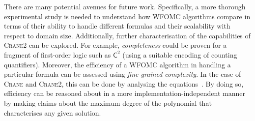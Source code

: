\documentclass[letterpaper]{article} %
\theoremstyle{remark}
\theoremstyle{definition}
\newcommand{\Ctwo}{$\mathsf{C}^{2}$}
\newcommand{\Cranetwo}{\textsc{Crane2}}
\begin{document}
There are many potential avenues for future work. Specifically, a more thorough
experimental study is needed to understand how WFOMC algorithms compare in terms
of their ability to handle different formulas and their scalability with respect
to domain size. Additionally, further characterisation of the capabilities of
\Cranetwo{} can be explored. For example, \emph{completeness} could be proven
for a fragment of first-order logic such as \Ctwo{} (using a suitable encoding
of counting quantifiers). Moreover, the efficiency of a WFOMC algorithm in
handling a particular formula can be assessed using \emph{fine-grained
  complexity}. In the case of \textsc{Crane} and \Cranetwo{}, this can be done
by analysing the equations~\cite{DBLP:conf/kr/DilkasB23}. By doing so,
efficiency can be reasoned about in a more implementation-independent manner by
making claims about the maximum degree of the polynomial that characterises any
given solution.


\end{document}
